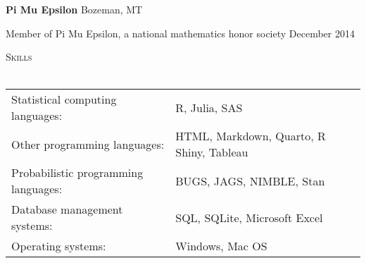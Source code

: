 \documentclass[a4paper]{article}
\newcommand{\lineunder} {
	\vspace*{-8pt} \\
	\hspace*{-18pt} \hrulefill \\
}
\newcommand{\header} [1] {
	{\hspace*{-18pt}\vspace*{6pt} \textcolor{Cerulean}{\textsc{#1}}}
	\vspace*{-6pt} \textcolor{Cerulean}{\lineunder}
}
\begin{document}
\textbf{Pi Mu Epsilon} \hfill Bozeman, MT

Member of Pi Mu Epsilon, a national mathematics honor society
\hfill December 2014

\vspace*{2mm}

\header{Skills}
\vspace*{2mm}
\begin{tabular}{ l l }
  Statistical computing languages:  & R, Julia, SAS \\
    Other programming languages:         &  HTML, Markdown, Quarto, R Shiny, Tableau \\
  Probabilistic programming languages:         & BUGS, JAGS, NIMBLE, Stan \\
    Database management systems:         & SQL, SQLite, Microsoft Excel \\
    Operating systems:       & Windows, Mac OS \\
\end{tabular}
\vspace*{2mm}
\end{document}
